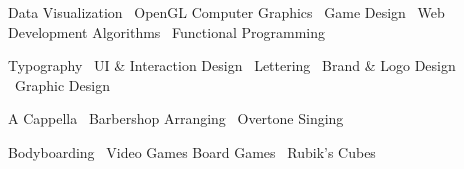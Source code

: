\documentclass{zres}
\begin{document}
\begin{sidebar}


\begin{infolist}
Data Visualization \textbullet\ 
OpenGL %
Computer Graphics \textbullet\ 
Game Design \textbullet\ 
Web Development %
Algorithms \textbullet\ 
Functional Programming
\end{infolist}


\begin{infolist}
Typography \textbullet\ 
UI \& Interaction Design \textbullet\ 
Lettering \textbullet\ 
Brand \& Logo Design \textbullet\ 
Graphic Design\fulljustify
\end{infolist}

\infosubsection{Music}

\begin{infolist}
A Cappella \textbullet\ 
Barbershop %
\mbox{Arranging} \textbullet\ 
Overtone Singing\fulljustify
\end{infolist}


\begin{infolist}
Bodyboarding \textbullet\ 
Video Games %
Board Games \textbullet\ 
Rubik's Cubes
\end{infolist}

\end{sidebar}
\end{document}
